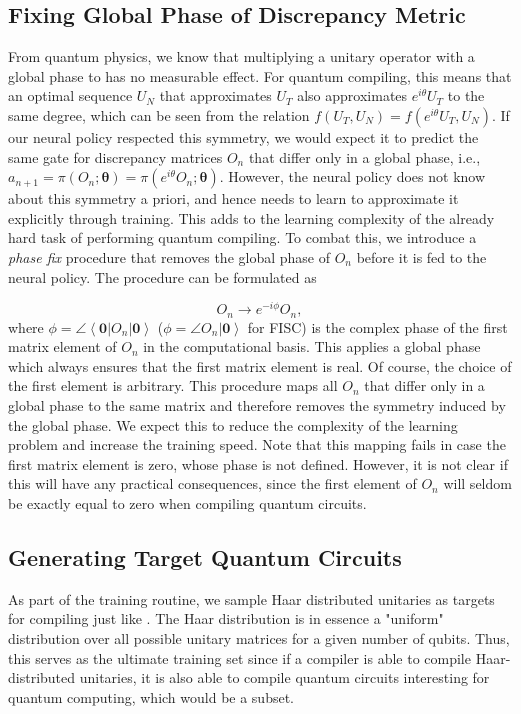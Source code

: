 \documentclass[%
 aip,
 floatfix,
 amsmath,amssymb,
 reprint,%
]{revtex4-1}
\newcommand{\ket}[1]{{\left|  #1 \right\rangle}}
\newcommand{\bra}[1]{{\left\langle  #1 \right|}}
\begin{document}
\subsection{Fixing Global Phase of Discrepancy Metric}
From quantum physics, we know that multiplying a unitary operator with a global phase to has no measurable effect. For quantum compiling, this means that an optimal sequence $U_N$ that approximates $U_T$ also approximates $e^{i\theta}U_T$ to the same degree, which can be seen from the relation $f(U_T, U_N) = f(e^{i\theta}U_T, U_N)$. If our neural policy respected this symmetry, we would expect it to predict the same gate for discrepancy matrices $O_n$ that differ only in a global phase, i.e., $a_{n+1} = \pi(O_n;\boldsymbol{\theta}) = \pi(e^{i\theta}O_n;\boldsymbol{\theta})$. However, the neural policy does not know about this symmetry a priori, and hence needs to learn to approximate it explicitly through training. This adds to the learning complexity of the already hard task of performing quantum compiling. To combat this, we introduce a \emph{phase fix} procedure that removes the global phase of $O_n$ before it is fed to the neural policy. The procedure can be formulated as    

\begin{equation}\label{eq:phasefix}
    O_n \rightarrow e^{-i\phi} O_n,
\end{equation}
where $\phi = \angle \bra{\boldsymbol{0}} O_n\ket{\boldsymbol{0}}$ ($\phi =\angle O_n\ket{\boldsymbol{0}}$ for FISC) is the complex phase of the first matrix element of $O_n$ in the computational basis. This applies a global phase which always ensures that the first matrix element is real. Of course, the choice of the first element is arbitrary. This procedure maps all $O_n$ that differ only in a global phase to the same matrix and therefore removes the symmetry induced by the global phase. We expect this to reduce the complexity of the learning problem and increase the training speed. Note that this mapping fails in case the first matrix element is zero, whose phase is not defined. However, it is not clear if this will have any practical consequences, since the first element of $O_n$ will seldom be exactly equal to zero when compiling quantum circuits.   

\subsection{Generating Target Quantum Circuits}
As part of the training routine, we sample Haar distributed unitaries as targets for compiling just like \citet{QCRL}. The Haar distribution is in essence a "uniform" distribution over all possible unitary matrices for a given number of qubits. Thus, this serves as the ultimate training set since if a compiler is able to compile Haar-distributed unitaries, it is also able to compile quantum circuits interesting for quantum computing, which would be a subset.  
\end{document}
